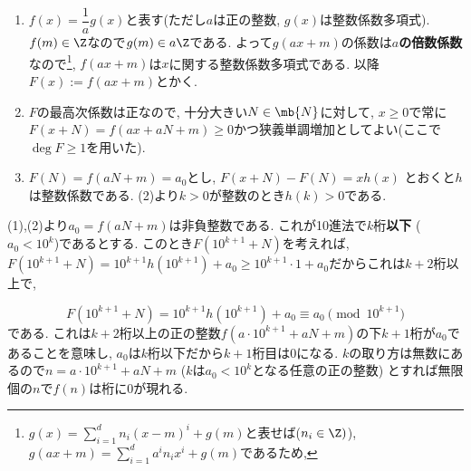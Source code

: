  \begin{enumerate}
        \item $f(x) = \dfrac{1}{a} g(x)$と表す(ただし$a$は正の整数, $g(x)$は整数係数多項式). $f(m)\in \Z$なので$g(m) \in a\Z$である. よって$g(ax + m)$の係数は\textbf{$a$の倍数係数}なので\footnote{$g(x) = \sum_{i=1}^{d} n_i (x-m)^{i} + g(m)$と表せば($n_i\in \Z )$), $g(ax + m) = \sum_{i=1}^{d}a^i n_i x^i+ g(m)$であるため, }, $f(ax + m)$は$x$に関する整数係数多項式である. 以降$F(x):= f(ax+m)$とかく.
        \item $F$の最高次係数は正なので, 十分大きい$N\in\mb{N}$に対して, $x\geq 0$で常に$F(x+N) = f(ax + aN + m) \geq 0$かつ狭義単調増加としてよい(ここで$\deg{F} \geq 1$を用いた).
        \item $F(N) = f(aN + m) = a_0$とし, $F(x+N) - F(N) = xh(x)$ とおくと$h$は整数係数である. (2)より$k>0$が整数のとき$h(k) > 0$である.

    \end{enumerate}
      (1),(2)より$a_0 = f(aN + m)$は非負整数である. これが10進法で$k$桁\textbf{以下} ($a_0 < 10^{k}$)であるとする. このとき$F(10^{k+1} + N)$を考えれば, $F(10^{k+1} + N) = 10^{k+1}h(10^{k+1}) + a_0 \geq 10^{k+1}\cdot 1 + a_0$だからこれは$k+2$桁以上で,

 \[
 F(10^{k+1} + N) =  10^{k+1} h(10^{k+1}) + a_0 \equiv a_0 \pmod{10^{k+1}}
 \]
 である. これは$k+2$桁以上の正の整数$f(a\cdot 10^{k+1} + aN + m)$の下$k+1$桁が$a_0$であることを意味し, $a_0$は$k$桁以下だから$k+1$桁目は0になる. $k$の取り方は無数にあるので$n = a\cdot 10^{k+1} + aN + m$ ($k$は$a_0 < 10^k$となる任意の正の整数) とすれば無限個の$n$で$f(n)$は桁に0が現れる.

